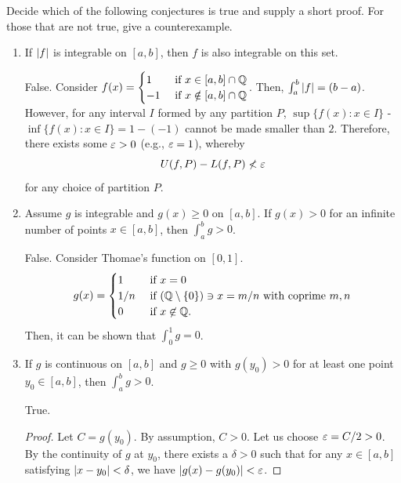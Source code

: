 \begin{problem}
  Decide which of the following conjectures is true and supply a short proof.
  For those that are not true, give a counterexample.
  \begin{enumerate}[label=(\alph*)]
    \item If $\left\lvert f \right\rvert$ is integrable on $[a, b]$, then $f$ is also integrable on this set.

      False. Consider $f(x) = \begin{cases}
        1   & \text{ if } x \in [a, b] \cap \mathbb{Q} \\
        -1   & \text{ if } x \notin [a, b] \cap \mathbb{Q} \\
      \end{cases}$. 
      Then, $\int_{a}^{b} \left\lvert f \right\rvert = (b - a)$. However, for any interval $I$ formed by any partition $P$,
      $\sup \{ f(x) : x \in I \}$ - $\inf \{ f(x) : x \in I \} = 1 - (-1)$ cannot be made smaller than $2$.
      Therefore, there exists some $\varepsilon > 0$ (e.g., $\varepsilon = 1$), whereby 
      \[
        U(f, P) - L(f, P) \nless \varepsilon 
      \]
      for any choice of partition $P$.

    \item Assume $g$ is integrable and $g(x) \geq 0$ on $[a, b]$. If $g(x) > 0$ for an infinite
      number of points $x \in [a, b]$, then $\int_{a}^{b} g > 0$.

      False. Consider Thomae's function on $[0, 1]$.
      \[
        g(x) = \begin{cases}
          1   & \text{ if } x = 0 \\ 
          1/n & \text{ if } (\mathbb{Q} \setminus \{ 0 \}) \ni x = m/n \text{ with coprime } m, n \\
          0   & \text{ if } x \not\in \mathbb{Q}. \\
        \end{cases}
      \]
      Then, it can be shown that $\int_{0}^{1} g = 0$.

    \item If $g$ is continuous on $[a, b]$ and $g \geq 0$ with $g(y_{0}) > 0$ for at least one point
      $y_{0} \in [a, b]$, then $\int_{a}^{b} g > 0$.

      True. 

  \begin{proof}
    Let $C = g(y_0)$. By assumption, $C > 0$. Let us choose $\varepsilon = C/2 > 0$.
    By the continuity of $g$ at $y_0$, there exists a $\delta > 0$ such that 
    for any $x \in [a, b]$ satisfying $\left\lvert x - y_0 \right\rvert < \delta$, we have $\left\lvert g(x) - g(y_0) \right\rvert < \varepsilon$.
    

\end{proof}
\end{enumerate}
\end{problem}
